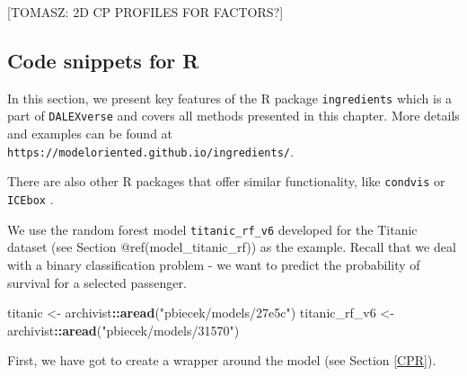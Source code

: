 \documentclass[12pt,]{krantz}
\newenvironment{Shaded}{\begin{snugshade}}{\end{snugshade}}
\newcommand{\DataTypeTok}[1]{\textcolor[rgb]{0.13,0.29,0.53}{#1}}
\newcommand{\DecValTok}[1]{\textcolor[rgb]{0.00,0.00,0.81}{#1}}
\newcommand{\KeywordTok}[1]{\textcolor[rgb]{0.13,0.29,0.53}{\textbf{#1}}}
\newcommand{\NormalTok}[1]{#1}
\newcommand{\OperatorTok}[1]{\textcolor[rgb]{0.81,0.36,0.00}{\textbf{#1}}}
\newcommand{\OtherTok}[1]{\textcolor[rgb]{0.56,0.35,0.01}{#1}}
\newcommand{\StringTok}[1]{\textcolor[rgb]{0.31,0.60,0.02}{#1}}
\begin{document}
{[}TOMASZ: 2D CP PROFILES FOR FACTORS?{]}

\hypertarget{ceterisParibus2R}{%
\subsection{Code snippets for R}\label{ceterisParibus2R}}

In this section, we present key features of the R package \texttt{ingredients} \citep{ingredientsRPackage} which is a part of \texttt{DALEXverse} and covers all methods presented in this chapter. More details and examples can be found at \texttt{https://modeloriented.github.io/ingredients/}.

There are also other R packages that offer similar functionality, like \texttt{condvis} \citep{JSSv081i05} or \texttt{ICEbox} \citep{ICEboxRPackage}.

We use the random forest model \texttt{titanic\_rf\_v6} developed for the Titanic dataset (see Section @ref(model\_titanic\_rf)) as the example. Recall that we deal with a binary classification problem - we want to predict the probability of survival for a selected passenger.

\begin{Shaded}
\begin{Highlighting}[]
\NormalTok{titanic <-}\StringTok{ }\NormalTok{archivist}\OperatorTok{::}\KeywordTok{aread}\NormalTok{(}\StringTok{"pbiecek/models/27e5c"}\NormalTok{)}
\NormalTok{titanic_rf_v6 <-}\StringTok{ }\NormalTok{archivist}\OperatorTok{::}\KeywordTok{aread}\NormalTok{(}\StringTok{"pbiecek/models/31570"}\NormalTok{)}
\end{Highlighting}
\end{Shaded}

First, we have got to create a wrapper around the model (see Section \ref{CPR}).

\begin{Shaded}
\end{Shaded}
\end{document}
